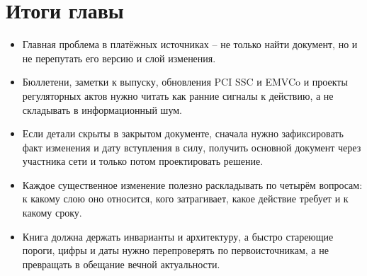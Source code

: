 \section*{Итоги главы}
\begin{itemize}
  \item Главная проблема в платёжных источниках -- не только найти
    документ, но и не перепутать его версию и слой изменения.
  \item Бюллетени, заметки к выпуску, обновления PCI SSC и EMVCo
    и проекты регуляторных актов нужно читать как ранние
    сигналы к действию, а не складывать в информационный шум.
  \item Если детали скрыты в закрытом документе, сначала нужно
    зафиксировать факт изменения и дату вступления в силу,
    получить основной документ через участника сети и только
    потом проектировать решение.
  \item Каждое существенное изменение полезно раскладывать по четырём
    вопросам: к какому слою оно относится, кого затрагивает,
    какое действие требует и к какому сроку.
  \item Книга должна держать инварианты и архитектуру, а быстро
    стареющие пороги, цифры и даты нужно перепроверять
    по первоисточникам, а не превращать в обещание вечной
    актуальности.
\end{itemize}
